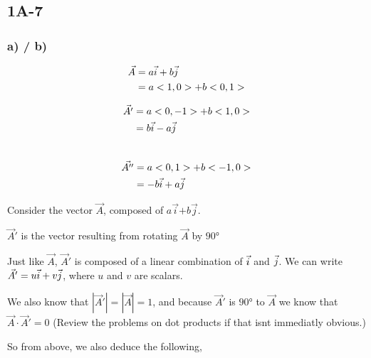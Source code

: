 \subsection*{1A-7}


\subsubsection*{a) / b)}

\begin{align*}
\vec{A} &= a\vec{i} + b\vec{j}\\
&= a<1,0> + b<0,1>\\
\end{align*}

\begin{align*}
\vec{A'} &= a<0,-1> + b <1,0>\\
&= b\vec{i} -a\vec{j}\\
\end{align*}\\

\begin{align*}
\vec{A''} &= a<0,1> + b <-1,0>\\
&= - b \vec{i} + a\vec{j}\\
\end{align*}



Consider the vector {\color{1}$\vec{A}$}, 
composed of {\color{2}$a\vec{i}$}$ + 
${\color{3}$b\vec{j}$}.

$\vec{A}'$ is the vector resulting from rotating {\color{1}$\vec{A}$} by $\ang{90}$


Just like $\vec{A}$, $\vec{A}'$ is composed of a linear combination 
of $\vec{i}$ and $\vec{j}$.
We can write $\vec{A}' = u\vec{i} + v\vec{j}$, where $u$ and $v$ are scalars.

We also know that $|\vec{A}'| = |\vec{A}| = 1$, and because $\vec{A}'
$ is $\ang{90}$ to $\vec{A}$ we know that $\vec{A} \cdot \vec{A}' = 0$ 
(Review the problems on dot products if that isnt immediatly obvious.)


So from above, we also deduce the following,


